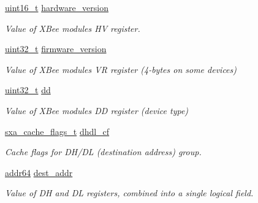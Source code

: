 \begin{DoxyCompactItemize}
\mbox{\label{structsxa__node__t_ad4c7c16c071f95965e2e506752b450fe}} 
\hyperlink{group__hal__dos_ga5a8b2dc9e45a9ee81a94ef304fb62505}{uint16\+\_\+t} \hyperlink{structsxa__node__t_ad4c7c16c071f95965e2e506752b450fe}{hardware\+\_\+version}
\begin{DoxyCompactList}\small\item\em Value of X\+Bee module\textquotesingle{}s HV register. \end{DoxyCompactList}\item 
\mbox{\label{structsxa__node__t_ac8e0f35fdeff288dd1a7b4f49754c9b2}} 
\hyperlink{group__hal__dos_ga09a1e304d66d35dd47daffee9731edaa}{uint32\+\_\+t} \hyperlink{structsxa__node__t_ac8e0f35fdeff288dd1a7b4f49754c9b2}{firmware\+\_\+version}
\begin{DoxyCompactList}\small\item\em Value of X\+Bee module\textquotesingle{}s VR register (4-\/bytes on some devices) \end{DoxyCompactList}\item 
\mbox{\label{structsxa__node__t_a296bccce81453e35d3726ac1476101eb}} 
\hyperlink{group__hal__dos_ga09a1e304d66d35dd47daffee9731edaa}{uint32\+\_\+t} \hyperlink{structsxa__node__t_a296bccce81453e35d3726ac1476101eb}{dd}
\begin{DoxyCompactList}\small\item\em Value of X\+Bee module\textquotesingle{}s DD register (device type) \end{DoxyCompactList}\item 
\mbox{\label{structsxa__node__t_adff7949139ea5500a94ee6fbedad3087}} 
\hyperlink{group___s_x_a_ga21b45e50d83fcc1363c4239313e88c06}{sxa\+\_\+cache\+\_\+flags\+\_\+t} \hyperlink{structsxa__node__t_adff7949139ea5500a94ee6fbedad3087}{dhdl\+\_\+cf}
\begin{DoxyCompactList}\small\item\em Cache flags for D\+H/\+DL (destination address) group. \end{DoxyCompactList}\item 
\hyperlink{unionaddr64}{addr64} \hyperlink{structsxa__node__t_abb357ccdd72453fd6f4ee76e18fde30c}{dest\+\_\+addr}
\begin{DoxyCompactList}\small\item\em Value of DH and DL registers, combined into a single logical field. \end{DoxyCompactList}\item 

\end{DoxyCompactItemize}
